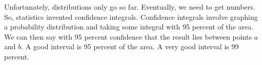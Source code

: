 Unfortunately, distributions only go so far.  Eventually, we need to get numbers.  So, statistics invented confidence integrals.  Confidence integrals involve graphing a probability distribution and taking some integral with 95 percent of the area.  We can then say with 95 percent confidence that the result lies between points $a$ and $b$.  A good interval is 95 percent of the area.  A very good interval is 99 percent.  


